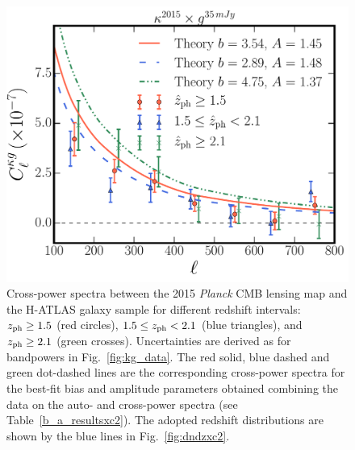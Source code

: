 \begin{figure} %
\centering %
\includegraphics[width=\textwidth]{Chapter4/Images/kg_ALL_2015_z15_21_10_SMM_35mJy}
\caption{Cross-power spectra between the 2015 \emph{Planck} CMB lensing map and the H-ATLAS galaxy sample for different redshift intervals: $z_{\rm{ph}} \ge 1.5$ (red circles), $1.5 \le z_{\rm{ph}} < 2.1$ (blue triangles), and $z_{\rm{ph}}\ge 2.1$ (green crosses). Uncertainties
are derived as for bandpowers in Fig.~\eqref{fig:kg_data}. The red solid, blue dashed and green dot-dashed lines are the corresponding cross-power spectra for the best-fit bias and amplitude parameters obtained combining the data on the auto- and cross-power spectra (see Table~\eqref{b_a_resultsxc2}). The adopted redshift distributions are shown by the blue lines in Fig.~\eqref{fig:dndzxc2}.
\label{fig:kg_data_tomo}}
\end{figure}

